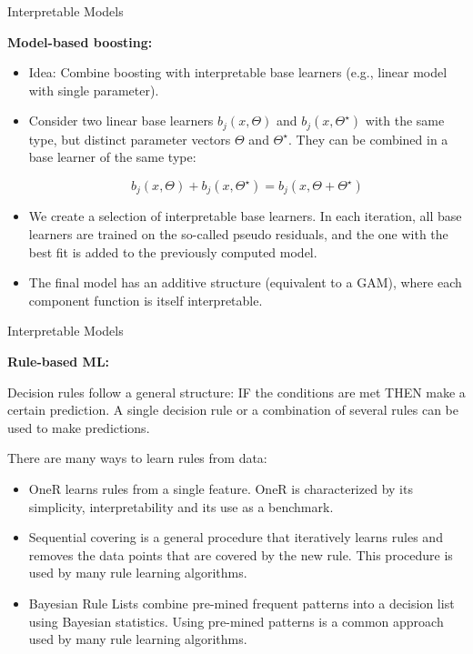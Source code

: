 \documentclass[11pt,compress,t,notes=noshow, xcolor=table]{beamer}
\begin{document}
\begin{vbframe}{Interpretable Models}


\textbf{Model-based boosting:}

\begin{itemize}

\item 
Idea: Combine boosting with interpretable base learners (e.g., linear model with single parameter).
\item
Consider two linear base learners $b_j(x, \Theta)$ and $b_j(x, \Theta^{\star})$ with the same type, but distinct parameter vectors $\Theta$ and $\Theta^{\star}$. They can be combined in a base learner of the same type:

$$
b_j(x, \Theta) + b_j(x, \Theta^{\star}) = b_j(x, \Theta + \Theta^{\star})
$$
\item We create a selection of interpretable base learners. In each iteration, all base learners are trained on the so-called pseudo residuals, and the one with the best fit is added to the previously computed model.
\item The final model has an additive structure (equivalent to a GAM), where each component function is itself interpretable.
\end{itemize}



\end{vbframe}

\begin{vbframe}{Interpretable Models}


\textbf{Rule-based ML:}


Decision rules follow a general structure: IF the conditions are met THEN make a certain prediction. A single decision rule or a combination of several rules can be used to make predictions.

\vspace{0.5cm}
There are many ways to learn rules from data:
\begin{itemize}
\item OneR learns rules from a single feature. OneR is characterized by its simplicity, interpretability and its use as a benchmark.
\item Sequential covering is a general procedure that iteratively learns rules and removes the data points that are covered by the new rule. This procedure is used by many rule learning algorithms.
\item Bayesian Rule Lists combine pre-mined frequent patterns into a decision list using Bayesian statistics. Using pre-mined patterns is a common approach used by many rule learning algorithms.
\end{itemize}

\end{vbframe}


\endlecture
\end{document}
